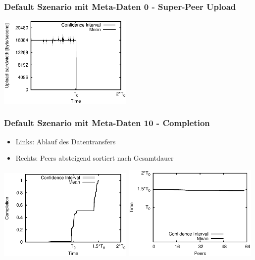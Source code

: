 \begin{frame}
  \frametitle{Default Szenario mit Meta-Daten 0 - Super-Peer Upload}
  \begin{center}
    \includegraphics[width=0.49\textwidth]{fig/plots/scenario_5_meta_data_0/plots/GeneratedMeanCurrentSuperSeederUploadBandwidth.csv.eps}
  \end{center}
\end{frame}




\begin{frame}
  \frametitle{Default Szenario mit Meta-Daten 10 - Completion}
  \begin{itemize}  
    \item Links: Ablauf des Datentransfers
    \item Rechts: Peers absteigend sortiert nach Gesamtdauer
  \end{itemize}

  \begin{center}
    \includegraphics[width=0.49\textwidth]{fig/plots/scenario_10_meta_data_10/plots/GeneratedMeanChunkCompletion.csv.eps}
    \hfill
    \includegraphics[width=0.49\textwidth]{fig/plots/scenario_10_meta_data_10/plots/GeneratedMeanSortedChunkCompletion.csv.eps}
  \end{center}
\end{frame}



